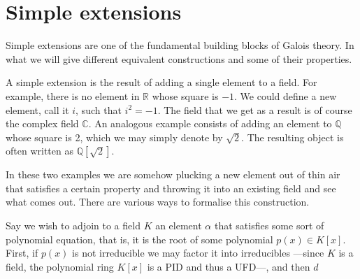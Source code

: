 \documentclass[12pt,oneside]{book}
\numberwithin{table}{section}
\numberwithin{equation}{section}
\numberwithin{figure}{section}
\newcommand{\R}{\mathbb{R}}
\newcommand{\C}{\mathbb{C}}
\newcommand{\Q}{\mathbb{Q}}
\begin{document}
\section{Simple extensions}
Simple extensions are one of the fundamental building blocks of Galois theory. In what we will give different equivalent constructions and some of their properties.

A simple extension is the result of adding a single element to a field. For example, there is no element in	\( \R \) whose square is \( -1 \). We could define a new element, call it \( i \), 
such that \( i^2 = -1 \). The field that we get as a result is of course the complex field \( \C \). An analogous example consists of adding an element to \( \Q \) whose square is 2, which we may simply denote by \( \sqrt{2} \). The resulting object is often written as \( \Q[\sqrt{2}] \).

In these two examples we are somehow plucking a new element out of thin air that satisfies a certain property and throwing it into an existing field and see what comes out. There are various ways to formalise this construction.



Say we wish to adjoin to a field \( K \) an element \( \alpha \) that satisfies some sort of polynomial equation, that is, it is the root of some polynomial \( p(x) \in K[x] \). First, if \( p(x) \) is not irreducible we may factor it into irreducibles ---since \( K \) is a field, the polynomial ring \( K[x] \) is a PID and thus a UFD---, and then \(  d \)
\end{document}
